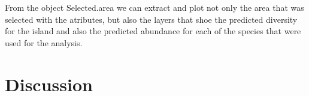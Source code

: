 \documentclass[article]{jss}
\begin{document}
From the object Selected.area we can extract and plot not only the area
that was selected with the atributes, but also the layers that shoe the
predicted diversity for the island and also the predicted abundance for
each of the species that were used for the analysis.

\section{Discussion}\label{discussion}

\renewcommand\refname{References}

\end{document}
